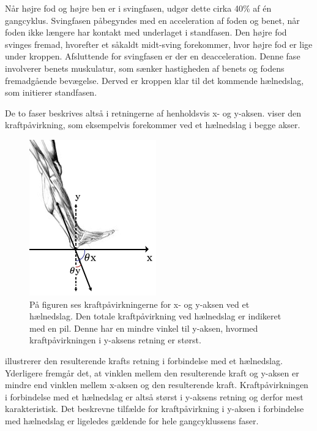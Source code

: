 Når højre fod og højre ben er i svingfasen, udgør dette cirka 40\% af én gangcyklus. Svingfasen påbegyndes med en acceleration af foden og benet, når foden ikke længere har kontakt med underlaget i standfasen. Den højre fod svinges fremad, hvorefter et såkaldt midt-sving forekommer, hvor højre fod er lige under kroppen. Afsluttende for svingfasen er der en deacceleration. Denne fase involverer benets muskulatur, som sænker hastigheden af benets og fodens fremadgående bevægelse. Derved er kroppen klar til det kommende hælnedslag, som initierer standfasen. \citep{VaughanDavisOConnor1992,Whittle1990}

De to faser beskrives altså i retningerne af henholdsvis x- og y-aksen.  viser den kraftpåvirkning, som eksempelvis forekommer ved et hælnedslag i begge akser.  
\begin{figure}[H]
	\centering
	\includegraphics[scale=0.7]{figures/bProblemloesning/kraefter_akser.png}
	\caption{På figuren ses kraftpåvirkningerne for x- og y-aksen ved et hælnedslag. Den totale kraftpåvirkning ved hælnedslag er indikeret med en pil. Denne har en mindre vinkel til y-aksen, hvormed kraftpåvirkningen i y-aksens retning er størst.}
	\label{fig:kraefter_akser}
\end{figure} %
 illustrerer den resulterende krafts retning i forbindelse med et hælnedslag. Yderligere fremgår det, at vinklen mellem den resulterende kraft og y-aksen er mindre end vinklen mellem x-aksen og den resulterende kraft. Kraftpåvirkningen i forbindelse med et hælnedslag er altså størst i y-aksens retning og derfor mest karakteristisk. Det beskrevne tilfælde for kraftpåvirkning i y-aksen i forbindelse med hælnedslag er ligeledes gældende for hele gangcyklussens faser. \citep{Rueterbories2010,Serway2010,ClelandKikhia2013}
